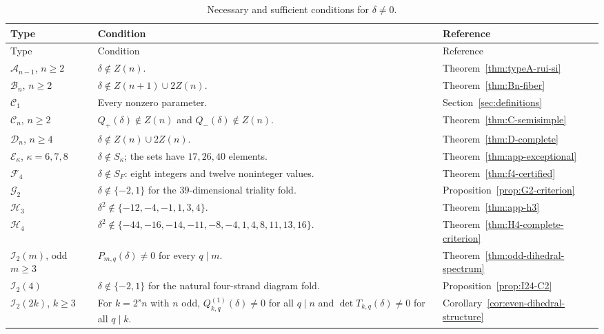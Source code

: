 \documentclass[11pt,a4paper]{amsart}
\theoremstyle{uprightdefinition}
\theoremstyle{remark}\newtheorem{remark}[theorem]{Remark}
\begin{document}
\begin{longtable}{@{}>{\raggedright\arraybackslash}p{}
 >{\raggedright\arraybackslash}p{}
 >{\raggedright\arraybackslash}p{}@{}}
\caption{Necessary and sufficient conditions for $\delta\ne0$.}
\label{tab:master-nonzero-semisimplicity}\\
\toprule
Type & Condition & Reference\\\midrule
\endfirsthead
\toprule Type & Condition & Reference\\\midrule
\endhead
\bottomrule\endfoot
$\mathscr{A}_{n-1}$, $n\ge2$ & $\delta\notin Z(n)$.
 & Theorem~\ref{thm:typeA-rui-si}\\[4pt]
$\mathscr{B}_n$, $n\ge2$ & $\delta\notin Z(n+1)\cup2Z(n)$.
 & Theorem~\ref{thm:Bn-fiber}\\[4pt]
$\mathscr{C}_1$ & Every nonzero parameter.
 & Section~\ref{sec:definitions}\\[4pt]
$\mathscr{C}_n$, $n\ge2$ & $Q_+(\delta)\notin Z(n)$ and $Q_-(\delta)\notin Z(n)$.
 & Theorem~\ref{thm:C-semisimple}\\[4pt]
$\mathscr{D}_n$, $n\ge4$ & $\delta\notin Z(n)\cup2Z(n)$.
 & Theorem~\ref{thm:D-complete}\\[4pt]
$\mathscr{E}_{\kappa}$, $\kappa=6,7,8$ & $\delta\notin S_{\kappa}$; the sets have $17,26,40$ elements.
 & Theorem~\ref{thm:app-exceptional}\\[4pt]
$\mathscr{F}_4$ & $\delta\notin S_F$: eight integers and twelve noninteger values.
 & Theorem~\ref{thm:f4-certified}\\[4pt]
$\mathscr{G}_2$ & $\delta\notin\{-2,1\}$ for the $39$-dimensional triality fold.
 & Proposition~\ref{prop:G2-criterion}\\[4pt]
$\mathscr{H}_3$ & $\delta^2\notin\{-12,-4,-1,1,3,4\}$.
 & Theorem~\ref{thm:app-h3}\\[4pt]
$\mathscr{H}_4$ & $\delta^2\notin\{-44,-16,-14,-11,-8,-4,1,4,8,11,13,16\}$.
 & Theorem~\ref{thm:H4-complete-criterion}\\[4pt]
$\mathscr{I}_2(m)$, odd $m\ge3$ & $P_{m,q}(\delta)\ne0$ for every $q\mid m$.
 & Theorem~\ref{thm:odd-dihedral-spectrum}\\[4pt]
$\mathscr{I}_2(4)$ & $\delta\notin\{-2,1\}$ for the natural four-strand diagram fold.
 & Proposition~\ref{prop:I24-C2}\\[4pt]
$\mathscr{I}_2(2k)$, $k\ge3$ & For $k=2^sn$ with $n$ odd,
$Q^{(1)}_{k,q}(\delta)\ne0$ for all $q\mid n$ and
$\det T_{k,q}(\delta)\ne0$ for all $q\mid k$.
 & Corollary~\ref{cor:even-dihedral-structure}\\
\end{longtable}
\end{document}
